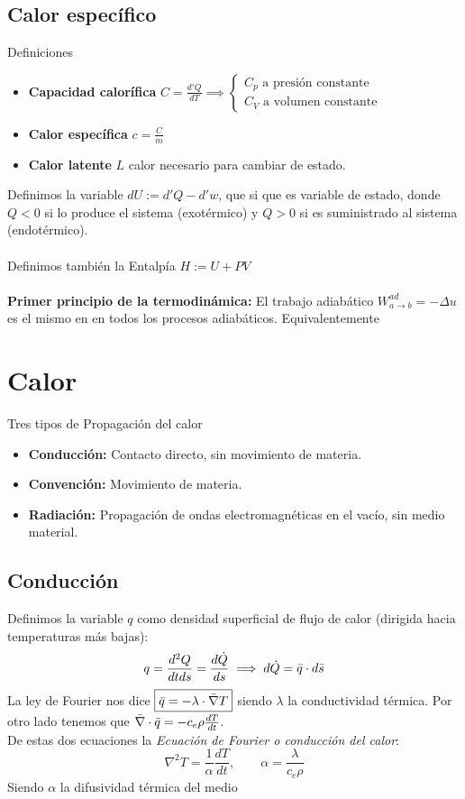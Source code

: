 \documentclass[leqno]{article}
\begin{document}
\subsection{Calor específico}
Definiciones
\begin{itemize}
    \item \textbf{Capacidad calorífica} $C=\frac{d'Q}{dT} \implies \begin{cases}
    C_p \text{ a presión constante} \\
    C_V \text{ a volumen constante}
    \end{cases}$
    \item \textbf{Calor específica} $c=\frac{C}{m}$
    \item \textbf{Calor latente} $L$ calor necesario para cambiar de estado.
\end{itemize}

Definimos la variable $\boxed{dU := d'Q - d'w}$, que si que es variable de estado, donde $Q<0$ si lo produce el sistema (exotérmico) y $Q>0$ si es suministrado al sistema (endotérmico). \\
\\
Definimos también la Entalpía $\boxed{H:=U+PV}$ \\
\\
\textbf{Primer principio de la termodinámica:} El trabajo adiabático $\boxed{W^{ad}_{a\to b} = -\Delta u}$ es el mismo en en todos los procesos adiabáticos.
Equivalentemente 




\section{Calor}
Tres tipos de Propagación del calor
\begin{itemize}
    \item \textbf{Conducción:} Contacto directo, sin movimiento de materia.
    \item \textbf{Convención:} Movimiento de materia.
     \item \textbf{Radiación:} Propagación de ondas electromagnéticas en el vacío, sin medio material.
\end{itemize}
\subsection{Conducción}
Definimos la variable $q$ como densidad superficial de flujo de calor (dirigida hacia temperaturas más bajas):
$$
q = \frac{d^2Q}{dtds} = \frac{d\dot{Q}}{ds} \implies d\dot{Q} = \Bar{q}\cdot d\Bar{s}
$$
La ley de Fourier nos dice $\boxed{\Bar{q} = -\lambda \cdot \Bar{\nabla}T}$ siendo $\lambda$ la conductividad térmica. Por otro lado tenemos que $\Bar{\nabla}\cdot \Bar{q} = -c_e\rho\frac{dT}{dt}$. \\
De estas dos ecuaciones la \textit{Ecuación de Fourier o conducción del calor}:
$$
\boxed{\nabla^2T=\frac{1}{\alpha}\frac{dT}{dt}}, \qquad \alpha = \frac{\lambda}{c_e\rho}
$$
Siendo $\alpha$ la difusividad térmica del medio
\end{document}
